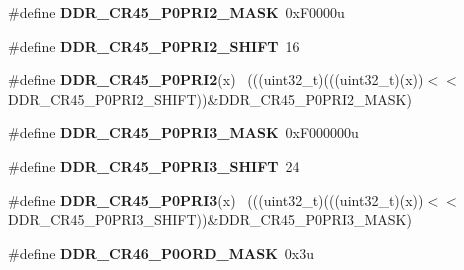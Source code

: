 \begin{DoxyCompactItemize}
\item 
\hypertarget{group___d_d_r___register___masks_ga28824cf9451050e5092ca659fabb2c2e}{}\#define {\bfseries D\+D\+R\+\_\+\+C\+R45\+\_\+\+P0\+P\+R\+I2\+\_\+\+M\+A\+S\+K}~0x\+F0000u\label{group___d_d_r___register___masks_ga28824cf9451050e5092ca659fabb2c2e}

\item 
\hypertarget{group___d_d_r___register___masks_ga599c478ee3cc80fca3d27205c5d045b2}{}\#define {\bfseries D\+D\+R\+\_\+\+C\+R45\+\_\+\+P0\+P\+R\+I2\+\_\+\+S\+H\+I\+F\+T}~16\label{group___d_d_r___register___masks_ga599c478ee3cc80fca3d27205c5d045b2}

\item 
\hypertarget{group___d_d_r___register___masks_gae5e84fefc76cd5af54a6a5aafcc0dc9c}{}\#define {\bfseries D\+D\+R\+\_\+\+C\+R45\+\_\+\+P0\+P\+R\+I2}(x)                                          ~(((uint32\+\_\+t)(((uint32\+\_\+t)(x))$<$$<$D\+D\+R\+\_\+\+C\+R45\+\_\+\+P0\+P\+R\+I2\+\_\+\+S\+H\+I\+F\+T))\&D\+D\+R\+\_\+\+C\+R45\+\_\+\+P0\+P\+R\+I2\+\_\+\+M\+A\+S\+K)\label{group___d_d_r___register___masks_gae5e84fefc76cd5af54a6a5aafcc0dc9c}

\item 
\hypertarget{group___d_d_r___register___masks_gaad4d6266cd9a5b459e6ae55e065d0fd3}{}\#define {\bfseries D\+D\+R\+\_\+\+C\+R45\+\_\+\+P0\+P\+R\+I3\+\_\+\+M\+A\+S\+K}~0x\+F000000u\label{group___d_d_r___register___masks_gaad4d6266cd9a5b459e6ae55e065d0fd3}

\item 
\hypertarget{group___d_d_r___register___masks_gad6160d26ca548d4418183ebfff604a2e}{}\#define {\bfseries D\+D\+R\+\_\+\+C\+R45\+\_\+\+P0\+P\+R\+I3\+\_\+\+S\+H\+I\+F\+T}~24\label{group___d_d_r___register___masks_gad6160d26ca548d4418183ebfff604a2e}

\item 
\hypertarget{group___d_d_r___register___masks_gae184449b71c3ec8df7c80474266fced3}{}\#define {\bfseries D\+D\+R\+\_\+\+C\+R45\+\_\+\+P0\+P\+R\+I3}(x)                                          ~(((uint32\+\_\+t)(((uint32\+\_\+t)(x))$<$$<$D\+D\+R\+\_\+\+C\+R45\+\_\+\+P0\+P\+R\+I3\+\_\+\+S\+H\+I\+F\+T))\&D\+D\+R\+\_\+\+C\+R45\+\_\+\+P0\+P\+R\+I3\+\_\+\+M\+A\+S\+K)\label{group___d_d_r___register___masks_gae184449b71c3ec8df7c80474266fced3}

\item 
\hypertarget{group___d_d_r___register___masks_gae6d386d9dc3a331b6b24ee599505a697}{}\#define {\bfseries D\+D\+R\+\_\+\+C\+R46\+\_\+\+P0\+O\+R\+D\+\_\+\+M\+A\+S\+K}~0x3u\label{group___d_d_r___register___masks_gae6d386d9dc3a331b6b24ee599505a697}


\end{DoxyCompactItemize}
